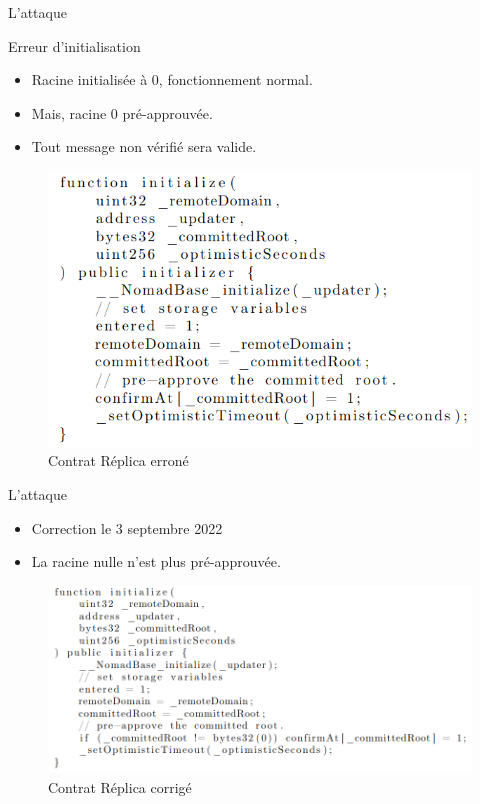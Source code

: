\begin{frame}{L'attaque}
    \begin{block}{Erreur d'initialisation}
        \begin{itemize}
            \item Racine initialisée à $0$, fonctionnement normal.
            \item Mais, racine $0$ pré-approuvée.
            \item Tout message non vérifié sera valide.
        \end{itemize}
    \end{block}
    \begin{figure}
        \centering
        \includegraphics[scale = 0.3]{centralisation/img/nomad_hack.png}
        \caption{Contrat Réplica erroné}
    \end{figure}
\end{frame}

\begin{frame}{L'attaque}
    \begin{itemize}
        \item Correction le 3 septembre 2022
        \item La racine nulle n'est plus pré-approuvée.
    \end{itemize}
    \begin{figure}
        \centering
        \includegraphics[scale = 0.3]{centralisation/img/nomad_fixed.png}
        \caption{Contrat Réplica corrigé}
    \end{figure}
\end{frame}